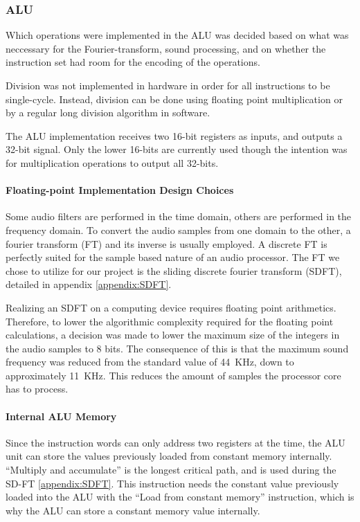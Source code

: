 \FloatBarrier
\subsubsection{ALU}\label{subsec:fpga-alu}

Which operations were implemented in the ALU was decided based on what
was neccessary for the Fourier-transform, sound processing, and on whether the
instruction set had room for the encoding of the operations.

Division was not implemented in hardware in order for all instructions to be
single-cycle. Instead, division can be done using floating point multiplication
or by a regular long division algorithm in software.

The ALU implementation receives two 16-bit registers as inputs, and outputs a
32-bit signal. Only the lower 16-bits are currently used though
the intention was for multiplication operations to output all 32-bits.

\paragraph{Floating-point Implementation Design Choices}

Some audio filters are performed in the time domain, others are performed in the
frequency domain. To convert the audio samples from one domain to the other, a
fourier transform (FT) and its inverse is usually employed. A discrete FT is
perfectly suited for the sample based nature of an audio processor. The FT we
chose to utilize for our project is the
sliding discrete fourier transform (SDFT), detailed in appendix \ref{appendix:SDFT}.

Realizing an SDFT on a computing device requires floating point arithmetics.
Therefore, to lower the algorithmic complexity required for the floating point
calculations, a decision was made to lower the maximum size of the integers in
the audio samples to 8 bits. The consequence of this is that the maximum sound
frequency was reduced from the standard value of 44~KHz, down to approximately 11~KHz.
This reduces the amount of samples the processor core has to process.

\paragraph{Internal ALU Memory}

Since the instruction words can only address two registers at the time, the ALU
unit can store the values previously loaded from constant memory internally.
``Multiply and accumulate'' is the longest critical path, and is used
during the SD-FT \ref{appendix:SDFT}. This instruction needs the constant value
previously loaded into the ALU with the ``Load from constant memory''
instruction, which is why the ALU can store a constant memory value internally.
